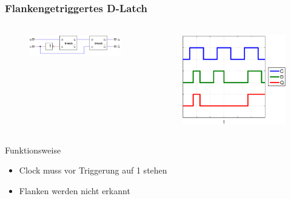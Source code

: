 \begin{frame}
    \frametitle{Flankengetriggertes D-Latch}
    \framesubtitle{}
     \begin{columns}[c]
         \begin{figure}[H]
         \begin{center}
                 \includegraphics[scale=0.25]{./img/schaltung/flanken_d.png}
         \end{center}
         \end{figure}
         \begin{figure}[H]
         \begin{center}
                 \includegraphics[scale=0.3]{./img/Aufgabe_3_d.eps}
         \end{center}
         \end{figure}
     \end{columns}
     \begin{block}{Funktionsweise}
        \begin{itemize}
            \item Clock muss vor Triggerung auf 1 stehen 
            \item Flanken werden nicht erkannt
        \end{itemize}
     \end{block}
\end{frame}
